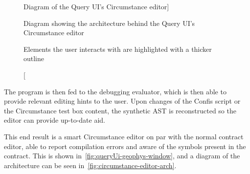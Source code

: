 \begin{figure}[h]
    \caption
    [Diagram of the Query UI's Circumstance editor]
    {Diagram showing the architecture behind the Query UI's Circumstance editor
    \par\footnotesize
    Elements the user interacts with are highlighted with a thicker outline
    }
    \label{fig:circumstance-editor-arch}
\end{figure}

The program is then fed to the debugging evaluator, which is then able to provide relevant editing hints to the user.
Upon changes of the Confis script or the Circumstance test box content, the synthetic AST is reconstructed so the editor can provide up-to-date aid.

This end result is a smart Circumstance editor on par with the normal contract editor, able to report compilation errors and aware of the symbols present in the contract.
This is shown in~\autoref{fig:queryUi-geophys-window}, and a diagram of the architecture can be seen in~\autoref{fig:circumstance-editor-arch}.

